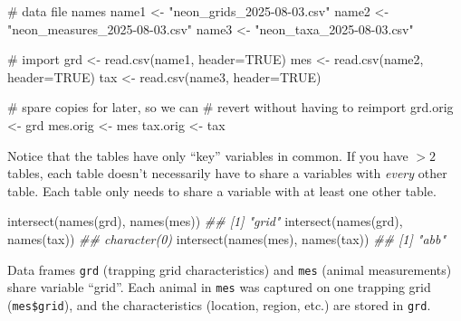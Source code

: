 \documentclass[
  13,
  letterpaper,
]{report}
\newenvironment{Shaded}{\begin{snugshade}}{\end{snugshade}}
\newcommand{\AttributeTok}[1]{\textcolor[rgb]{0.40,0.45,0.13}{#1}}
\newcommand{\CommentTok}[1]{\textcolor[rgb]{0.37,0.37,0.37}{#1}}
\newcommand{\ConstantTok}[1]{\textcolor[rgb]{0.56,0.35,0.01}{#1}}
\newcommand{\DocumentationTok}[1]{\textcolor[rgb]{0.37,0.37,0.37}{\textit{#1}}}
\newcommand{\FunctionTok}[1]{\textcolor[rgb]{0.28,0.35,0.67}{#1}}
\newcommand{\NormalTok}[1]{\textcolor[rgb]{0.00,0.23,0.31}{#1}}
\newcommand{\OtherTok}[1]{\textcolor[rgb]{0.00,0.23,0.31}{#1}}
\newcommand{\StringTok}[1]{\textcolor[rgb]{0.13,0.47,0.30}{#1}}
\begin{document}
\begin{Shaded}
\begin{Highlighting}[]
\CommentTok{\# data file names}
\NormalTok{name1 }\OtherTok{\textless{}{-}} \StringTok{"neon\_grids\_2025{-}08{-}03.csv"}
\NormalTok{name2 }\OtherTok{\textless{}{-}} \StringTok{"neon\_measures\_2025{-}08{-}03.csv"}
\NormalTok{name3 }\OtherTok{\textless{}{-}} \StringTok{"neon\_taxa\_2025{-}08{-}03.csv"}

\CommentTok{\# import}
\NormalTok{grd }\OtherTok{\textless{}{-}} \FunctionTok{read.csv}\NormalTok{(name1, }\AttributeTok{header=}\ConstantTok{TRUE}\NormalTok{)}
\NormalTok{mes }\OtherTok{\textless{}{-}} \FunctionTok{read.csv}\NormalTok{(name2, }\AttributeTok{header=}\ConstantTok{TRUE}\NormalTok{)}
\NormalTok{tax }\OtherTok{\textless{}{-}} \FunctionTok{read.csv}\NormalTok{(name3, }\AttributeTok{header=}\ConstantTok{TRUE}\NormalTok{)}

\CommentTok{\# spare copies for later, so we can }
\CommentTok{\# revert without having to reimport}
\NormalTok{grd.orig }\OtherTok{\textless{}{-}}\NormalTok{ grd}
\NormalTok{mes.orig }\OtherTok{\textless{}{-}}\NormalTok{ mes}
\NormalTok{tax.orig }\OtherTok{\textless{}{-}}\NormalTok{ tax}
\end{Highlighting}
\end{Shaded}

Notice that the tables have only ``key'' variables in common. If you
have \(>2\) tables, each table doesn't necessarily have to share a
variables with \emph{every} other table. Each table only needs to share
a variable with at least one other table.

\begin{Shaded}
\begin{Highlighting}[]
\FunctionTok{intersect}\NormalTok{(}\FunctionTok{names}\NormalTok{(grd), }\FunctionTok{names}\NormalTok{(mes))}
\DocumentationTok{\#\# [1] "grid"}
\FunctionTok{intersect}\NormalTok{(}\FunctionTok{names}\NormalTok{(grd), }\FunctionTok{names}\NormalTok{(tax))}
\DocumentationTok{\#\# character(0)}
\FunctionTok{intersect}\NormalTok{(}\FunctionTok{names}\NormalTok{(mes), }\FunctionTok{names}\NormalTok{(tax))}
\DocumentationTok{\#\# [1] "abb"}
\end{Highlighting}
\end{Shaded}

Data frames \texttt{grd} (trapping grid characteristics) and
\texttt{mes} (animal measurements) share variable ``grid''. Each animal
in \texttt{mes} was captured on one trapping grid (\texttt{mes\$grid}),
and the characteristics (location, region, etc.) are stored in
\texttt{grd}.
\end{document}

